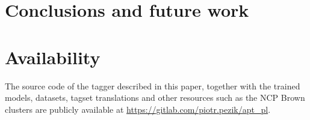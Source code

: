 \documentclass[10pt, a4paper]{article}
\begin{document}
\section{Conclusions and future work}


\section{Availability}

The source code of the tagger described in this paper, together with the trained models, datasets, tagset translations and other resources such as the NCP Brown clusters are publicly available at \url{https://gitlab.com/piotr.pezik/apt_pl}.



 
\end{document}
